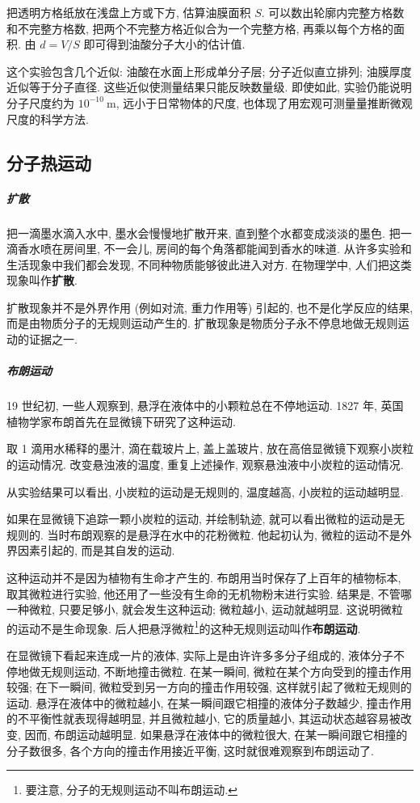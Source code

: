 \documentclass[UTF8,openany,fontset=fandol]{ctexbook}
\theoremstyle{chinesetextbook}
\newcommand{\unit}[1]{\ \mathrm{#1}}
\begin{document}
把透明方格纸放在浅盘上方或下方, 估算油膜面积 $S$. 可以数出轮廓内完整方格数和不完整方格数, 把两个不完整方格近似合为一个完整方格, 再乘以每个方格的面积. 由 $d=V/S$ 即可得到油酸分子大小的估计值.

这个实验包含几个近似: 油酸在水面上形成单分子层; 分子近似直立排列; 油膜厚度近似等于分子直径. 这些近似使测量结果只能反映数量级. 即使如此, 实验仍能说明分子尺度约为 $10^{-10}\unit{m}$, 远小于日常物体的尺度, 也体现了用宏观可测量量推断微观尺度的科学方法.
\subsection*{分子热运动}
\subparagraph{扩散} 把一滴墨水滴入水中, 墨水会慢慢地扩散开来, 直到整个水都变成淡淡的墨色. 把一滴香水喷在房间里, 不一会儿, 房间的每个角落都能闻到香水的味道. 从许多实验和生活现象中我们都会发现, 不同种物质能够彼此进入对方. 在物理学中, 人们把这类现象叫作\textbf{扩散}.

扩散现象并不是外界作用 (例如对流, 重力作用等) 引起的, 也不是化学反应的结果, 而是由物质分子的无规则运动产生的. 扩散现象是物质分子永不停息地做无规则运动的证据之一.

\subparagraph{布朗运动} 19 世纪初, 一些人观察到, 悬浮在液体中的小颗粒总在不停地运动. 1827 年, 英国植物学家布朗首先在显微镜下研究了这种运动.

{\kaishu 取 1 滴用水稀释的墨汁, 滴在载玻片上, 盖上盖玻片, 放在高倍显微镜下观察小炭粒的运动情况. 改变悬浊液的温度, 重复上述操作, 观察悬浊液中小炭粒的运动情况.}

从实验结果可以看出, 小炭粒的运动是无规则的, 温度越高, 小炭粒的运动越明显.

如果在显微镜下追踪一颗小炭粒的运动, 并绘制轨迹, 就可以看出微粒的运动是无规则的. 当时布朗观察的是悬浮在水中的花粉微粒. 他起初认为, 微粒的运动不是外界因素引起的, 而是其自发的运动.

这种运动并不是因为植物有生命才产生的. 布朗用当时保存了上百年的植物标本, 取其微粒进行实验, 他还用了一些没有生命的无机物粉末进行实验. 结果是, 不管哪一种微粒, 只要足够小, 就会发生这种运动; 微粒越小, 运动就越明显. 这说明微粒的运动不是生命现象. 后人把悬浮微粒\footnote{要注意, 分子的无规则运动不叫布朗运动.}的这种无规则运动叫作\textbf{布朗运动}.

在显微镜下看起来连成一片的液体, 实际上是由许许多多分子组成的, 液体分子不停地做无规则运动, 不断地撞击微粒. 在某一瞬间, 微粒在某个方向受到的撞击作用较强; 在下一瞬间, 微粒受到另一方向的撞击作用较强, 这样就引起了微粒无规则的运动. 悬浮在液体中的微粒越小, 在某一瞬间跟它相撞的液体分子数越少, 撞击作用的不平衡性就表现得越明显, 并且微粒越小, 它的质量越小, 其运动状态越容易被改变, 因而, 布朗运动越明显. 如果悬浮在液体中的微粒很大, 在某一瞬间跟它相撞的分子数很多, 各个方向的撞击作用接近平衡, 这时就很难观察到布朗运动了.
\end{document}
